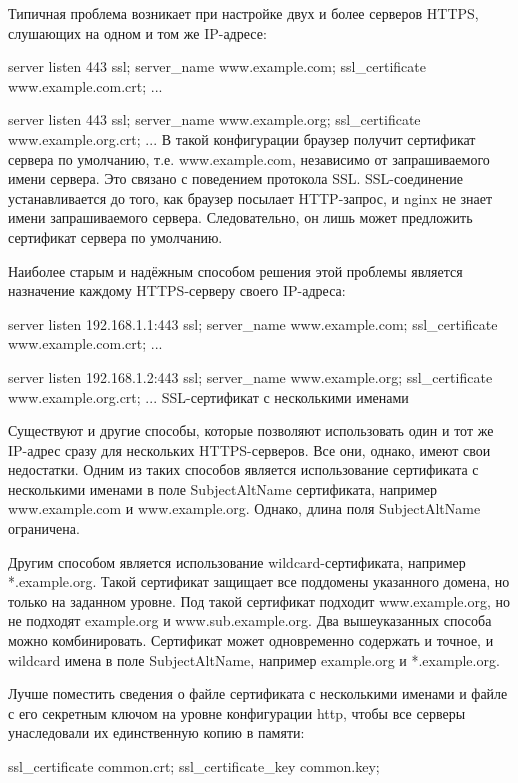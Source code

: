 \documentclass[a4paper,10pt,twoside]{article}
\begin{document}
{{Типичная проблема возникает при настройке двух и более серверов HTTPS, слушающих на одном и том же IP-адресе:

server {
    listen          443 ssl;
    server_name     www.example.com;
    ssl_certificate www.example.com.crt;
    ...
}

server {
    listen          443 ssl;
    server_name     www.example.org;
    ssl_certificate www.example.org.crt;
    ...
}
В такой конфигурации браузер получит сертификат сервера по умолчанию, т.е. www.example.com, независимо от запрашиваемого имени сервера. Это связано с поведением протокола SSL. SSL-соединение устанавливается до того, как браузер посылает HTTP-запрос, и nginx не знает имени запрашиваемого сервера. Следовательно, он лишь может предложить сертификат сервера по умолчанию.

Наиболее старым и надёжным способом решения этой проблемы является назначение каждому HTTPS-серверу своего IP-адреса:

server {
    listen          192.168.1.1:443 ssl;
    server_name     www.example.com;
    ssl_certificate www.example.com.crt;
    ...
}

server {
    listen          192.168.1.2:443 ssl;
    server_name     www.example.org;
    ssl_certificate www.example.org.crt;
    ...
}
SSL-сертификат с несколькими именами

Существуют и другие способы, которые позволяют использовать один и тот же IP-адрес сразу для нескольких HTTPS-серверов. Все они, однако, имеют свои недостатки. Одним из таких способов является использование сертификата с несколькими именами в поле SubjectAltName сертификата, например www.example.com и www.example.org. Однако, длина поля SubjectAltName ограничена.

Другим способом является использование wildcard-сертификата, например *.example.org. Такой сертификат защищает все поддомены указанного домена, но только на заданном уровне. Под такой сертификат подходит www.example.org, но не подходят example.org и www.sub.example.org. Два вышеуказанных способа можно комбинировать. Сертификат может одновременно содержать и точное, и wildcard имена в поле SubjectAltName, например example.org и *.example.org.

Лучше поместить сведения о файле сертификата с несколькими именами и файле с его секретным ключом на уровне конфигурации http, чтобы все серверы унаследовали их единственную копию в памяти:

ssl_certificate     common.crt;
ssl_certificate_key common.key;

}}
\end{document}
